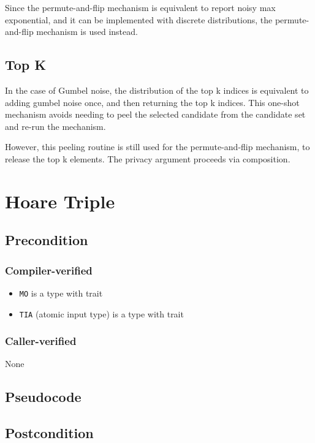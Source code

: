 \documentclass{article}
\begin{document}
Since the permute-and-flip mechanism is equivalent to report noisy max exponential,
and it can be implemented with discrete distributions,
the permute-and-flip mechanism is used instead.

\subsection{Top K}
In the case of Gumbel noise, the distribution of the top k indices is equivalent to adding gumbel noise once,
and then returning the top k indices.
This one-shot mechanism avoids needing to peel the selected candidate from the candidate set and re-run the mechanism.

However, this peeling routine is still used for the permute-and-flip mechanism,
to release the top k elements.
The privacy argument proceeds via composition.

\section{Hoare Triple}
\subsection*{Precondition}
\subsubsection*{Compiler-verified}
\begin{itemize}
    \item \texttt{MO} is a type with trait 
    \item \texttt{TIA} (atomic input type) is a type with trait 
\end{itemize}

\subsubsection*{Caller-verified}
None

\subsection*{Pseudocode}
\label{sec:python-pseudocode}


\subsection*{Postcondition}
\end{document}
